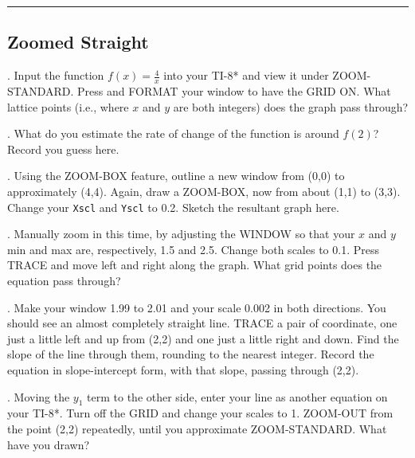 \renewcommand{\columnseprule}{1.5pt}
\begin{multicols*}{2}
\noindent
\rule[0.5\baselineskip]{0.5\textwidth}{1pt}

\noindent
\subsection{Zoomed Straight}
. Input the function $f(x)=\frac{4}{x}$ into your TI-8* and view
it under ZOOM-STANDARD.  Press \Touche[style=function,principal={2ND}]
\Touche[style=function,principal={ZOOM}] and FORMAT your
window to have the GRID ON.  What lattice points (i.e., where
$x$ and $y$ are both integers) does the graph pass through?

\vspace{2cm}
. What do you estimate the rate of change of the function is around 
$f(2)$? Record you guess here.

\vspace{1cm}
.  Using the ZOOM-BOX feature, outline a new window from (0,0) to
approximately (4,4).  Again, draw a ZOOM-BOX, now from about  (1,1)
to (3,3).  Change your \texttt{Xscl} and \texttt{Yscl} to 0.2.  Sketch the 
resultant graph here.

  
. Manually zoom in this time, by adjusting the WINDOW so that your
$x$ and $y$ min and max are, respectively, 1.5 and 2.5.  Change both scales
to 0.1.  Press TRACE and move left and right along the graph.  What 
grid points does the equation pass through?  

\vspace{3cm}
.  Make your window 1.99 to 2.01 and your scale 0.002 in both directions.
You should see an almost completely straight line.  TRACE a pair of coordinate,
one just a little left and up from (2,2) and one just a little right and down.  Find
the slope of the line through them, rounding to the nearest integer.  
Record the equation in slope-intercept form,
with that slope, passing through (2,2).

\vspace{3cm}
. Moving the $y_1$ term to the other side, enter your line as another equation
on your TI-8*.  Turn off the GRID and change your scales to 1.  ZOOM-OUT
from the point (2,2) repeatedly, until you approximate ZOOM-STANDARD.
What have you drawn?


\end{multicols*}
